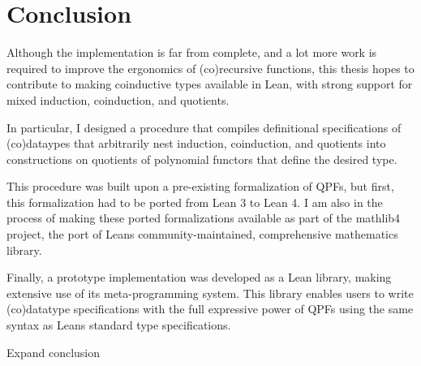 
\chapter{Conclusion}%
\label{ch:conclusion}

Although the implementation is far from complete, and a lot more work is required to improve the ergonomics of (co)recursive functions, this thesis hopes to contribute to making coinductive types available in Lean, with strong support for mixed induction, coinduction, and quotients. 

In particular, I designed a procedure that compiles definitional specifications of (co)dataypes
that arbitrarily nest induction, coinduction, and quotients into constructions on quotients of polynomial functors that define the desired type.

This procedure was built upon a pre-existing formalization of QPFs, but first,
this formalization had to be ported from Lean 3 to Lean 4. I am also in the process of making
these ported formalizations available as part of the mathlib4 project, the port of Leans community-maintained, comprehensive mathematics library.

Finally, a prototype implementation was developed as a Lean library, making extensive use of its meta-programming system.
This library enables users to write (co)datatype specifications with the full expressive power of QPFs using the
same syntax as Leans standard \inductive{} type specifications.

\begin{todo}
    Expand conclusion
\end{todo}